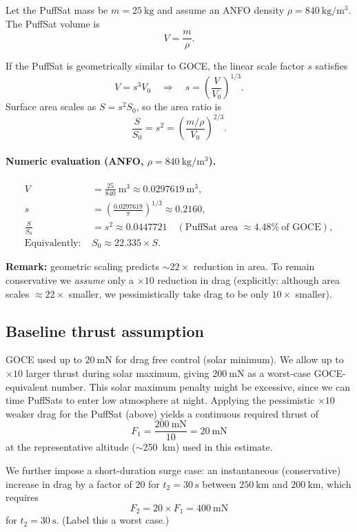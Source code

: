 \documentclass{article}
\begin{document}
Let the PuffSat mass be \(m=\SI{25}{\kg}\) and assume an ANFO density
\(\rho=\SI{840}{\kg\per\m^3}\).  The PuffSat volume is
\[
V=\frac{m}{\rho}.
\]

If the PuffSat is geometrically similar to GOCE, the linear scale factor \(s\) satisfies
\[
V = s^3 V_0
\quad\Longrightarrow\quad
s = \left(\frac{V}{V_0}\right)^{1/3}.
\]
Surface area scales as \(S = s^2 S_0\), so the area ratio is
\[
\frac{S}{S_0} = s^2 = \left(\frac{m/\rho}{V_0}\right)^{2/3}.
\]

\paragraph{Numeric evaluation (ANFO, \(\rho=\SI{840}{\kg\per\m^3}\)).}
\[
\begin{aligned}
V &= \frac{25}{840}\ \mathrm{m^3} \approx 0.0297619\ \mathrm{m^3},\\[4pt]
s &= \left(\frac{0.0297619}{\pi}\right)^{1/3} \approx 0.2160,\\[4pt]
\frac{S}{S_0} &= s^2 \approx 0.0447721 \quad(\text{PuffSat area } \approx 4.48\%\ \text{of GOCE}),\\[4pt]
\text{Equivalently: } & S_0 \approx 22.335 \times S.
\end{aligned}
\]

\noindent\textbf{Remark:} geometric scaling predicts \(\sim22\times\) reduction in area.  To remain conservative we \emph{assume} only a \(\times 10\) reduction in drag (explicitly: although area scales \(\approx22\times\) smaller, we pessimistically take drag to be only \(10\times\) smaller).

\subsection*{Baseline thrust assumption}
GOCE used up to \(\SI{20}{\milli\newton}\) for drag free control (solar minimum).  We  allow up to \(\times 10\) larger thrust during solar maximum, giving \(\SI{200}{\milli\newton}\) as a worst-case GOCE-equivalent number.  This solar maximum penalty might be excessive, since we can time PuffSats to enter low atmosphere at night.  Applying the pessimistic \(\times 10\) weaker drag for the PuffSat (above) yields a continuous required thrust of
\[
F_1 = \frac{\SI{200}{\milli\newton}}{10} = \SI{20}{\milli\newton}
\]
at the representative altitude (\(\sim\)\SI{250}{\kilo\metre}) used in this estimate. 

We further impose a short-duration surge case: an instantaneous (conservative) increase in drag by a factor of \(20\) for \(t_2=\SI{30}{\s}\) between \(\SI{250}{\kilo\metre}\) and \(\SI{200}{\kilo\metre}\), which requires
\[
F_2 = 20\times F_1 = \SI{400}{\milli\newton}
\]
for \(t_2=\SI{30}{\s}\).  (Label this a worst case.)
\end{document}
